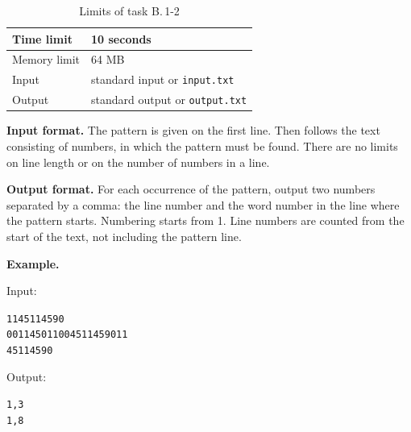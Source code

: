 

\begin{table}[!ht]
\centering
\begin{tabular}{|l|l|}
\hline
Time limit & 10 seconds \\
\hline
Memory limit & 64 MB \\
\hline
Input & standard input or \texttt{input.txt} \\
\hline
Output & standard output or \texttt{output.txt} \\
\hline
\end{tabular}
\caption{Limits of task B.\,1-2}
\end{table}

{\bfseries Input format.} The pattern is given on the first line. Then follows the text
consisting of numbers, in which the pattern must be found.
There are no limits on line length or on the number of numbers in a line.

{\bfseries Output format.} For each occurrence of the pattern, output two numbers separated
by a comma: the line number and the word number in the line where the pattern starts.
Numbering starts from 1. Line numbers are counted from the start of the text, not including
the pattern line.

{\bfseries Example.}

Input:
\begin{alltt}
11 45 11 45 90
0011 45 011 0045 11 45 90    11
45 11 45 90
\end{alltt}

Output:
\begin{alltt}
1, 3
1, 8
\end{alltt}

\pagebreak

